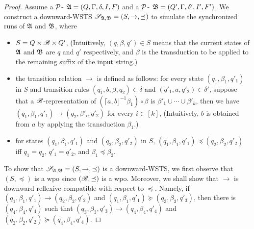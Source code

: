 \begin{proof}
Assume a ${\mathcal{P} }$-{\WOTrNFA} ${\mathfrak{A} } = (Q, \Gamma, \delta, I, F)$ and a ${\mathcal{P} }$-{\NFA} ${\mathfrak{B} } = (Q', \Gamma, \delta', I', F')$.
We construct a downward-WSTS $\mathscr{S}_{{\mathfrak{A} },{\mathfrak{B} }} = (S, \rightarrow, \preceq)$ 
%
to simulate the synchronized runs of ${\mathfrak{A} }$ and ${\mathfrak{B} }$, where
\begin{itemize}
	\item $S = Q \times {\mathscr{B} } \times Q'$, (Intuitively, $(q, \beta, q') \in S$ means that the current states of ${\mathfrak{A} }$ and ${\mathfrak{B} }$ are $q$ and $q'$ respectively, and $\beta$ is the transduction to be applied to the remaining suffix of the input string.)
	\item the transition relation $\xrightarrow{}$ is defined as follows:  for every state $(q_1, \beta_1, q'_1)$ in $S$ and transition rules $(q_1, b, \beta, q_2) \in \delta$ and $(q'_1, a, q'_2) \in \delta'$, suppose that a ${\mathscr{B} }$-representation of $( \lceil a, b \rfloor^{-1} \beta_1) \circ \beta$ is $\beta'_1 \cup \cdots \cup \beta'_k$,  then we have $(q_1, \beta_1, q'_1) \xrightarrow{} (q_2, \beta'_i, q'_2)$ for every $i \in [k]$, (Intuitively, $b$ is obtained from $a$ by applying the transduction $\beta_1$.)
%	
	\item for states $(q_1, \beta_1, q'_1)$ and $(q_2, \beta_2, q'_2)$ in $S$, $(q_1, \beta_1, q'_1) \preceq (q_2, \beta_2, q'_2)$ iff $q_1= q_2$, $q'_1 = q'_2$, and $\beta_1 \preceq \beta_2$.
\end{itemize}

To show that $\mathscr{S}_{{\mathfrak{A} },{\mathfrak{B} }} = (S, \rightarrow, \preceq)$ is a downward-WSTS, we first observe that $(S, \preceq)$ is a wpo since $({\mathscr{B} }, \preceq)$ is a wpo. Moreover, we shall show that $\rightarrow$ is downward reflexive-compatible with respect to $\preceq$. Namely, if $(q_1, \beta_1, q'_1) \rightarrow (q_2, \beta_2, q'_2)$ and $(q_1, \beta_1, q'_1) \succeq (q_3, \beta_3, q'_3)$, then there is $(q_4, \beta_4, q'_4)$ such that $(q_3, \beta_3, q'_3) \rightarrow (q_4, \beta_4, q'_4)$ and $(q_2, \beta_2, q'_2) \succeq (q_4, \beta_4, q'_4)$. 


\end{proof}
